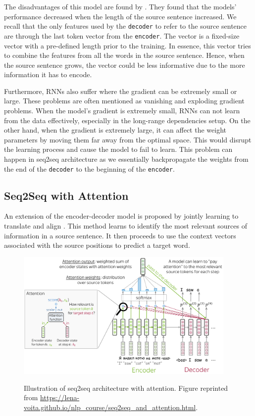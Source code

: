 The disadvantages of this model are found by \cite{cho2014properties}. They found that the models' performance decreased when the length of the source sentence increased. We recall that the only features used by the \texttt{decoder} to refer to the source sentence are through the last token vector from the \texttt{encoder}. The vector is a fixed-size vector with a pre-defined length prior to the training. In essence, this vector tries to combine the features from all the words in the source sentence. Hence, when the source sentence grows, the vector could be less informative due to the more information it has to encode.

Furthermore, RNNs also suffer where the gradient can be extremely small or large. These problems are often mentioned as vanishing and exploding gradient problems. When the model's gradient is extremely small, RNNs can not learn from the data effectively, especially in the long-range dependencies setup. On the other hand, when the gradient is extremely large, it can affect the weight parameters by moving them far away from the optimal space. This would disrupt the learning process and cause the model to fail to learn. This problem can happen in seq2seq architecture as we essentially backpropagate the weights from the end of the \texttt{decoder} to the beginning of the \texttt{encoder}.

\subsection{Seq2Seq with Attention}
An extension of the encoder-decoder model is proposed by jointly learning to translate and align \cite{bahdanau2015nmt}. This method learns to identify the most relevant sources of information in a source sentence. It then proceeds to use the context vectors associated with the source positions to predict a target word.

\begin{figure}[h]
    {\includegraphics[width=0.95\textwidth]{img/attseq2seq.png}}
    \centering
    \caption{Illustration of seq2seq architecture with attention. Figure reprinted from \protect\url{https://lena-voita.github.io/nlp_course/seq2seq_and_attention.html}.}
    \label{img:attseq2seq}
\end{figure}



